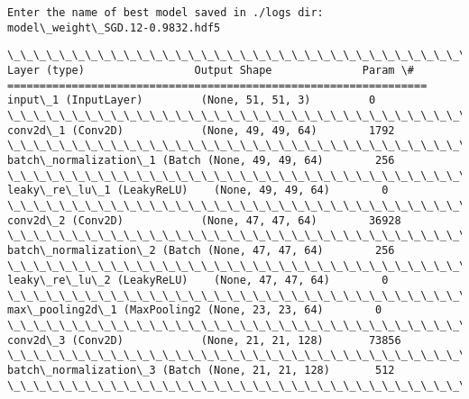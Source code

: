 \documentclass[11pt]{article}
\begin{document}
    \begin{Verbatim}[commandchars=\\\{\}]
Enter the name of best model saved in ./logs dir:  model\_weight\_SGD.12-0.9832.hdf5

    \end{Verbatim}

    \begin{Verbatim}[commandchars=\\\{\}]
\_\_\_\_\_\_\_\_\_\_\_\_\_\_\_\_\_\_\_\_\_\_\_\_\_\_\_\_\_\_\_\_\_\_\_\_\_\_\_\_\_\_\_\_\_\_\_\_\_\_\_\_\_\_\_\_\_\_\_\_\_\_\_\_\_
Layer (type)                 Output Shape              Param \#   
=================================================================
input\_1 (InputLayer)         (None, 51, 51, 3)         0         
\_\_\_\_\_\_\_\_\_\_\_\_\_\_\_\_\_\_\_\_\_\_\_\_\_\_\_\_\_\_\_\_\_\_\_\_\_\_\_\_\_\_\_\_\_\_\_\_\_\_\_\_\_\_\_\_\_\_\_\_\_\_\_\_\_
conv2d\_1 (Conv2D)            (None, 49, 49, 64)        1792      
\_\_\_\_\_\_\_\_\_\_\_\_\_\_\_\_\_\_\_\_\_\_\_\_\_\_\_\_\_\_\_\_\_\_\_\_\_\_\_\_\_\_\_\_\_\_\_\_\_\_\_\_\_\_\_\_\_\_\_\_\_\_\_\_\_
batch\_normalization\_1 (Batch (None, 49, 49, 64)        256       
\_\_\_\_\_\_\_\_\_\_\_\_\_\_\_\_\_\_\_\_\_\_\_\_\_\_\_\_\_\_\_\_\_\_\_\_\_\_\_\_\_\_\_\_\_\_\_\_\_\_\_\_\_\_\_\_\_\_\_\_\_\_\_\_\_
leaky\_re\_lu\_1 (LeakyReLU)    (None, 49, 49, 64)        0         
\_\_\_\_\_\_\_\_\_\_\_\_\_\_\_\_\_\_\_\_\_\_\_\_\_\_\_\_\_\_\_\_\_\_\_\_\_\_\_\_\_\_\_\_\_\_\_\_\_\_\_\_\_\_\_\_\_\_\_\_\_\_\_\_\_
conv2d\_2 (Conv2D)            (None, 47, 47, 64)        36928     
\_\_\_\_\_\_\_\_\_\_\_\_\_\_\_\_\_\_\_\_\_\_\_\_\_\_\_\_\_\_\_\_\_\_\_\_\_\_\_\_\_\_\_\_\_\_\_\_\_\_\_\_\_\_\_\_\_\_\_\_\_\_\_\_\_
batch\_normalization\_2 (Batch (None, 47, 47, 64)        256       
\_\_\_\_\_\_\_\_\_\_\_\_\_\_\_\_\_\_\_\_\_\_\_\_\_\_\_\_\_\_\_\_\_\_\_\_\_\_\_\_\_\_\_\_\_\_\_\_\_\_\_\_\_\_\_\_\_\_\_\_\_\_\_\_\_
leaky\_re\_lu\_2 (LeakyReLU)    (None, 47, 47, 64)        0         
\_\_\_\_\_\_\_\_\_\_\_\_\_\_\_\_\_\_\_\_\_\_\_\_\_\_\_\_\_\_\_\_\_\_\_\_\_\_\_\_\_\_\_\_\_\_\_\_\_\_\_\_\_\_\_\_\_\_\_\_\_\_\_\_\_
max\_pooling2d\_1 (MaxPooling2 (None, 23, 23, 64)        0         
\_\_\_\_\_\_\_\_\_\_\_\_\_\_\_\_\_\_\_\_\_\_\_\_\_\_\_\_\_\_\_\_\_\_\_\_\_\_\_\_\_\_\_\_\_\_\_\_\_\_\_\_\_\_\_\_\_\_\_\_\_\_\_\_\_
conv2d\_3 (Conv2D)            (None, 21, 21, 128)       73856     
\_\_\_\_\_\_\_\_\_\_\_\_\_\_\_\_\_\_\_\_\_\_\_\_\_\_\_\_\_\_\_\_\_\_\_\_\_\_\_\_\_\_\_\_\_\_\_\_\_\_\_\_\_\_\_\_\_\_\_\_\_\_\_\_\_
batch\_normalization\_3 (Batch (None, 21, 21, 128)       512       
\_\_\_\_\_\_\_\_\_\_\_\_\_\_\_\_\_\_\_\_\_\_\_\_\_\_\_\_\_\_\_\_\_\_\_\_\_\_\_\_\_\_\_\_\_\_\_\_\_\_\_\_\_\_\_\_\_\_\_\_\_\_\_\_\_

\end{Verbatim}
\end{document}
